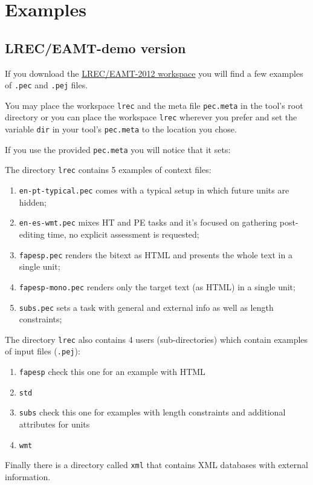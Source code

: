 \chapter{Examples}

\section{LREC/EAMT-demo version}

If you download the \href{http://pers-www.wlv.ac.uk/~in1676/resources/pet/workspaces.html}{LREC/EAMT-2012 workspace} you will find a few examples of {\tt .pec} and {\tt .pej} files.

You may place the workspace {\tt lrec} and the meta file {\tt pec.meta} in the tool's root directory or you can place the workspace {\tt lrec} wherever you prefer and set the variable {\tt dir} in your tool's {\tt pec.meta} to the location you chose.

If you use the provided {\tt pec.meta} you will notice that it sets:

\begin{description}
	\setlength\itemindent{0.5cm}  
	\item[\param{dir}{lrec}]
	\item[\param{default}{en-pt-typical.pec}]
\end{description}

The directory {\tt lrec} contains 5 examples of context files:

\begin{enumerate}
	\item {\tt en-pt-typical.pec} comes with a typical setup in which future units are hidden;
	\item {\tt en-es-wmt.pec} mixes HT and PE tasks and it's focused on gathering post-editing time, no explicit assessment is requested;
	\item {\tt fapesp.pec} renders the bitext as HTML and presents the whole text in a single unit;
	\item {\tt fapesp-mono.pec} renders only the target text (as HTML) in a single unit;
	\item {\tt subs.pec} sets a task with general and external info as well as length constraints;
\end{enumerate}

The directory {\tt lrec} also contains 4 users (sub-directories) which contain examples of input files ({\tt .pej}):

\begin{enumerate}
	\item {\tt fapesp} check this one for an example with HTML
	\item {\tt std}
	\item {\tt subs} check this one for examples with length constraints and additional attributes for units
	\item {\tt wmt}
\end{enumerate}

Finally there is a directory called {\tt xml} that contains XML databases with external information.